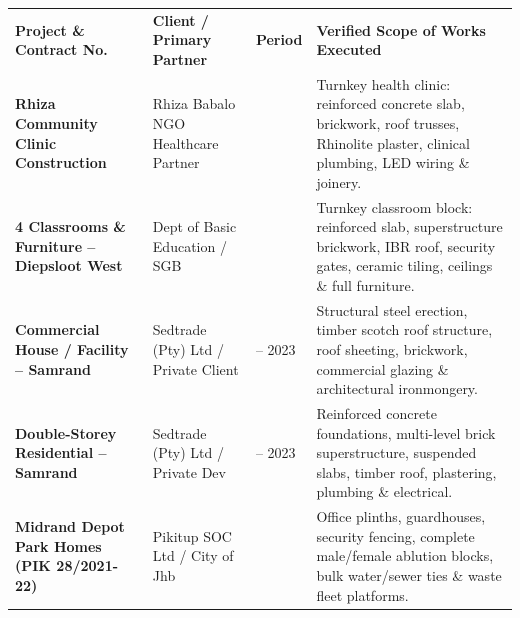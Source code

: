 \documentclass[a4paper,11pt]{article}
\begin{document}
\renewcommand{\arraystretch}{1.30}
\begin{tabularx}{\textwidth}{@{}p{3.8cm} p{3.2cm} p{1.8cm} X@{}}
\rowcolor{mhnavy}
{\color{white}\bfseries\fontsize{8pt}{9.8pt}\selectfont Project \& Contract No.} &
{\color{white}\bfseries\fontsize{8pt}{9.8pt}\selectfont Client / Primary Partner} &
{\color{white}\bfseries\fontsize{8pt}{9.8pt}\selectfont Period} &
{\color{white}\bfseries\fontsize{8pt}{9.8pt}\selectfont Verified Scope of Works Executed} \\
\rowcolor{mhbluelight}
\fontsize{7.6pt}{9.4pt}\selectfont\bfseries Rhiza Community Clinic Construction & \fontsize{7.6pt}{9.4pt}\selectfont Rhiza Babalo NGO Healthcare Partner & \fontsize{7.6pt}{9.4pt}\selectfont 2021 & \fontsize{7.6pt}{9.4pt}\selectfont Turnkey health clinic: reinforced concrete slab, brickwork, roof trusses, Rhinolite plaster, clinical plumbing, LED wiring \& joinery. \\
\fontsize{7.6pt}{9.4pt}\selectfont\bfseries 4 Classrooms \& Furniture -- Diepsloot West & \fontsize{7.6pt}{9.4pt}\selectfont Dept of Basic Education / SGB & \fontsize{7.6pt}{9.4pt}\selectfont 2023 & \fontsize{7.6pt}{9.4pt}\selectfont Turnkey classroom block: reinforced slab, superstructure brickwork, IBR roof, security gates, ceramic tiling, ceilings \& full furniture. \\
\rowcolor{mhbluelight}
\fontsize{7.6pt}{9.4pt}\selectfont\bfseries Commercial House / Facility -- Samrand & \fontsize{7.6pt}{9.4pt}\selectfont Sedtrade (Pty) Ltd / Private Client & \fontsize{7.6pt}{9.4pt}\selectfont 2022 -- 2023 & \fontsize{7.6pt}{9.4pt}\selectfont Structural steel erection, timber scotch roof structure, roof sheeting, brickwork, commercial glazing \& architectural ironmongery. \\
\fontsize{7.6pt}{9.4pt}\selectfont\bfseries Double-Storey Residential -- Samrand & \fontsize{7.6pt}{9.4pt}\selectfont Sedtrade (Pty) Ltd / Private Dev & \fontsize{7.6pt}{9.4pt}\selectfont 2022 -- 2023 & \fontsize{7.6pt}{9.4pt}\selectfont Reinforced concrete foundations, multi-level brick superstructure, suspended slabs, timber roof, plastering, plumbing \& electrical. \\
\rowcolor{mhbluelight}
\fontsize{7.6pt}{9.4pt}\selectfont\bfseries Midrand Depot Park Homes (PIK 28/2021-22) & \fontsize{7.6pt}{9.4pt}\selectfont Pikitup SOC Ltd / City of Jhb & \fontsize{7.6pt}{9.4pt}\selectfont 2022 & \fontsize{7.6pt}{9.4pt}\selectfont Office plinths, guardhouses, security fencing, complete male/female ablution blocks, bulk water/sewer ties \& waste fleet platforms. \\
\end{tabularx}
\renewcommand{\arraystretch}{1}
\end{document}
